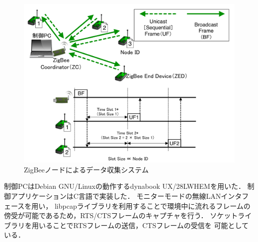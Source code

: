 \documentclass[technicalreport]{ieicej}
\begin{document}
\begin{figure}[bt]
 \centering
 \includegraphics[width=\columnwidth]{figure/aacts_snw.pdf}
 \caption{ZigBeeノードによるデータ収集システム}
 \label{fig:aacts_snw}
\end{figure}



制御PCはDebian GNU/Linuxの動作するdynabook UX/28LWHEMを用いた．
制御アプリケーションはC言語で実装した．
モニターモードの無線LANインタフェースを用い，
libpcapライブラリを利用することで環境中に流れるフレームの
傍受が可能であるため，RTS/CTSフレームのキャプチャを行う．
ソケットライブラリを用いることでRTSフレームの送信，CTSフレームの受信を
可能としている．
\end{document}
